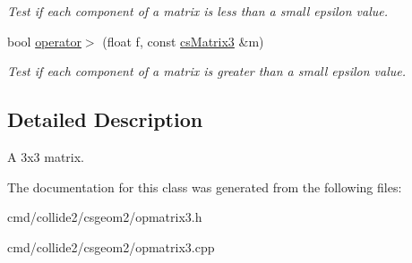\begin{DoxyCompactItemize}
\begin{DoxyCompactList}\small\item\em Test if each component of a matrix is less than a small epsilon value. \end{DoxyCompactList}\item 
bool \hyperlink{classcsMatrix3_a72eb8fb14377b25cc558731610d32e1a}{operator$>$} (float f, const \hyperlink{classcsMatrix3}{cs\+Matrix3} \&m)\hypertarget{classcsMatrix3_a72eb8fb14377b25cc558731610d32e1a}{}\label{classcsMatrix3_a72eb8fb14377b25cc558731610d32e1a}

\begin{DoxyCompactList}\small\item\em Test if each component of a matrix is greater than a small epsilon value. \end{DoxyCompactList}\end{DoxyCompactItemize}


\subsection{Detailed Description}
A 3x3 matrix. 

The documentation for this class was generated from the following files\+:\begin{DoxyCompactItemize}
\item 
cmd/collide2/csgeom2/opmatrix3.\+h\item 
cmd/collide2/csgeom2/opmatrix3.\+cpp\end{DoxyCompactItemize}
